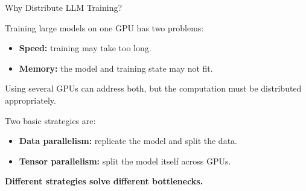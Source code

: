 \documentclass[11pt,compress,t,notes=noshow, xcolor=table]{beamer}
\begin{document}



\begin{vbframe}{Why Distribute LLM Training?}

Training large models on one GPU has two problems:

\begin{itemize}
    \item \textbf{Speed:} training may take too long.
    \item \textbf{Memory:} the model and training state may not fit.
\end{itemize}

Using several GPUs can address both, but the computation must be
distributed appropriately.

Two basic strategies are:

\begin{itemize}
    \item \textbf{Data parallelism:} replicate the model and split the data.
    \item \textbf{Tensor parallelism:} split the model itself across GPUs.
\end{itemize}

\begin{center}
\textbf{Different strategies solve different bottlenecks.}
\end{center}

\end{vbframe}
\end{document}
